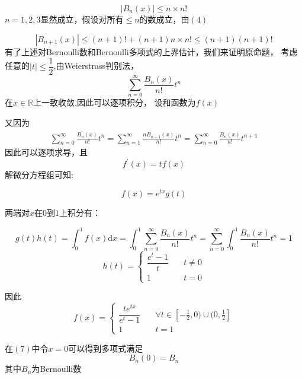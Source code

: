 \documentclass[a4paper,12pt]{ctexart}
\newenvironment{prooff}{{\noindent\it\textcolor{black}{Proof}:}\quad}{\par}
\theoremstyle{definition}
\begin{document}
\begin{prooff}
    \begin{equation}
        |B_{n}(x)|\le n \times  n!
    \end{equation}
    $n=1,2,3$显然成立，假设对所有$\le n$的数成立，由$(4)$

    \begin{equation*}
        |B_{n+1}(x)|\le (n+1)!+(n+1)n\times n! \le (n+1)(n+1)!
    \end{equation*}
    有了上述对Bernoulli数和Bernoulli多项式的上界估计，我们来证明原命题，
    考虑任意的$|t|\le \dfrac{1}{2}$,由Weierstrass判别法，$$\sum_{n=0}^{\infty}\frac{B_n(x)}{n!}t^n$$在$x\in \mathbb{R}$上一致收敛,因此可以逐项积分，
    设和函数为$f(x)$

    又因为
    \begin{align*}
        \sum_{n=0}^{\infty}\frac{B_n^{\prime}(x)}{n!}t^n=\sum_{n=1}^{\infty}\frac{nB_{n-1}(x)}{n!}t^n=\sum_{n=0}^{\infty}\frac{B_n(x)}{n!}t^{n+1}
    \end{align*}
    因此可以逐项求导，且$$f^{\prime}(x)=tf(x)$$
    解微分方程组可知:

    \begin{equation*}
        f(x)=e^{tx}g(t)
    \end{equation*}

    两端对$x$在$0$到$1$上积分有：

    \begin{equation*}
        g(t)h(t)=\int _0^1f(x)\text{d}x=\int _0^1\sum_{n=0}^{\infty}\frac{B_n(x)}{n!}t^n=\sum_{n=0}^{\infty}\int _0^1\frac{B_n(x)}{n!}t^n=1
    \end{equation*}
    $$h(t)=\begin{cases}
            \dfrac{e^t-1}{t} & \quad t\neq 0 \\
            1                & \quad t=0
        \end{cases}
    $$

    因此\begin{equation}f(x)=\begin{cases}
            \dfrac{te^{tx}}{e^t-1} & \quad \forall t\in [-\frac{1}{2},0)\cup(0,\frac{1}{2}] \\
            1                      & \quad  t=1
        \end{cases}
    \end{equation}
\end{prooff}
在$(7)$中令$x=0$可以得到多项式满足$$B_n(0)=B_n$$
其中$B_n$为Bernoulli数
\end{document}
